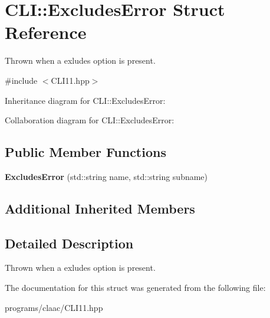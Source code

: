 \hypertarget{struct_c_l_i_1_1_excludes_error}{}\section{C\+LI\+:\+:Excludes\+Error Struct Reference}
\label{struct_c_l_i_1_1_excludes_error}


Thrown when a exludes option is present.  




{\ttfamily \#include $<$C\+L\+I11.\+hpp$>$}



Inheritance diagram for C\+LI\+:\+:Excludes\+Error\+:


Collaboration diagram for C\+LI\+:\+:Excludes\+Error\+:
\subsection*{Public Member Functions}
\begin{DoxyCompactItemize}
\item 
\mbox{\label{struct_c_l_i_1_1_excludes_error_ac019c598d7bd8bd6a370aaf05f0ddda2}} 
{\bfseries Excludes\+Error} (std\+::string name, std\+::string subname)
\end{DoxyCompactItemize}
\subsection*{Additional Inherited Members}


\subsection{Detailed Description}
Thrown when a exludes option is present. 

The documentation for this struct was generated from the following file\+:\begin{DoxyCompactItemize}
\item 
programs/claac/C\+L\+I11.\+hpp\end{DoxyCompactItemize}

